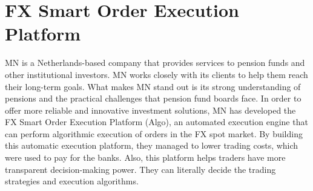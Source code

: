 



\section{FX Smart Order Execution Platform} \label{sec:Algo}
MN is a Netherlands-based company that provides services to pension funds and other institutional investors. MN works closely with its clients to help them reach their long-term goals. What makes MN stand out is its strong understanding of pensions and the practical challenges that pension fund boards face. In order to offer more reliable and innovative investment solutions, MN has developed the FX Smart Order Execution Platform (Algo), an automated execution engine that can perform algorithmic execution of orders in the FX spot market. By building this automatic execution platform, they managed to lower trading costs, which were used to pay for the banks. Also, this platform helps traders have more transparent decision-making power. They can literally decide the trading strategies and execution algorithms.




